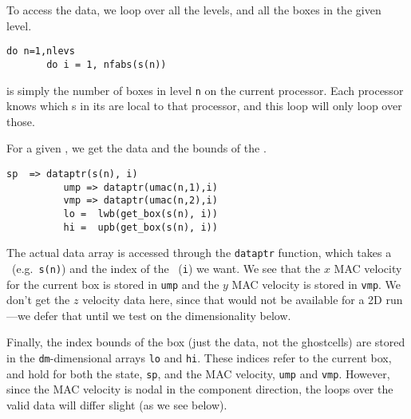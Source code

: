 To access the data, we loop over all the levels, and all the boxes in
the given level.
\begin{lstlisting}[language={[95]fortran},mathescape=false]
    do n=1,nlevs
       do i = 1, nfabs(s(n))
\end{lstlisting}
 is simply the number of boxes in level {\tt n} on
the current processor.  Each processor knows which \fab s in its
\multifab are local to that processor, and this loop will only loop
over those.

For a given \boxtype, we get the data and the bounds of the \boxtype.
\begin{lstlisting}[language={[95]fortran},mathescape=false]
          sp  => dataptr(s(n), i)
          ump => dataptr(umac(n,1),i)
          vmp => dataptr(umac(n,2),i)
          lo =  lwb(get_box(s(n), i))
          hi =  upb(get_box(s(n), i))
\end{lstlisting}


The actual data array is accessed through the {\tt dataptr} function,
which takes a \multifab\ (e.g.\ {\tt s(n)}) and the index of the
\boxtype\ ({\tt i}) we want.  We see that the $x$ MAC velocity for the
current box is stored in {\tt ump} and the $y$ MAC velocity is stored
in {\tt vmp}.  We don't get the $z$ velocity data here, since that
would not be available for a 2D run---we defer that until we test on
the dimensionality below.

Finally, the index bounds of the box (just the data, not the ghostcells) are 
stored in the {\tt dm}-dimensional arrays {\tt lo} and {\tt hi}.  These indices
refer to the current box, and hold for both the state, {\tt sp}, and the MAC
velocity, {\tt ump} and {\tt vmp}.  However, since the MAC velocity is nodal
in the component direction, the loops over the valid data will differ
slight (as we see below).

